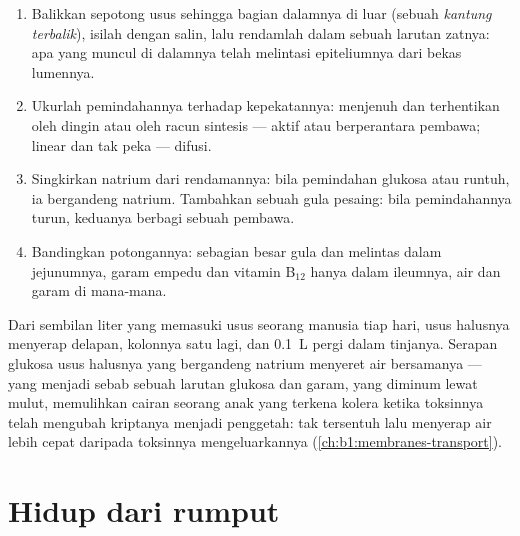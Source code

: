 \begin{method}\label{met:b1:digestion-absorption:everted}
\begin{enumerate}
  \item Balikkan sepotong usus sehingga bagian dalamnya di luar
        (sebuah \emph{kantung terbalik}), isilah dengan salin, lalu
        rendamlah dalam sebuah larutan zatnya: apa yang muncul di
        dalamnya telah melintasi epiteliumnya dari bekas lumennya.
  \item Ukurlah pemindahannya terhadap kepekatannya: menjenuh dan
        terhentikan oleh dingin atau oleh racun sintesis  --- aktif
        atau berperantara pembawa; linear dan tak peka --- difusi.
  \item Singkirkan natrium dari rendamannya: bila pemindahan glukosa
        atau  runtuh, ia bergandeng natrium. Tambahkan
        sebuah gula pesaing: bila pemindahannya turun, keduanya berbagi
        sebuah pembawa.
  \item Bandingkan potongannya: sebagian besar gula dan 
        melintas dalam jejunumnya, garam empedu dan vitamin B$_{12}$
        hanya dalam ileumnya, air dan garam di mana-mana.
\end{enumerate}
\end{method}

\begin{example}\label{ex:b1:digestion-absorption:water}
Dari sembilan liter yang memasuki usus seorang manusia tiap hari, usus
halusnya menyerap delapan, kolonnya satu lagi, dan \qty{0.1}{L} pergi
dalam tinjanya. Serapan glukosa usus halusnya yang bergandeng natrium
menyeret air bersamanya --- yang menjadi sebab sebuah larutan glukosa
dan garam, yang diminum lewat mulut, memulihkan cairan seorang anak
yang terkena kolera ketika toksinnya telah mengubah kriptanya menjadi
penggetah:  tak tersentuh lalu menyerap air lebih cepat
daripada toksinnya mengeluarkannya
(\cref{ch:b1:membranes-transport}).
\end{example}

\section{Hidup dari rumput}

